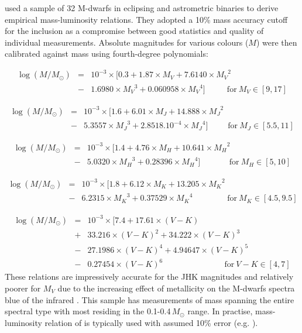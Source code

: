\citet{2000A&A...364..217D} used a sample of 32 M-dwarfs in eclipsing and astrometric binaries to derive empirical mass-luminosity relations. They adopted a 10\% mass accuracy cutoff for the inclusion as a compromise between good statistics and quality of individual measurements. Absolute magnitudes for various colours ($M$) were then calibrated against mass using fourth-degree polynomials:
%

\begin{eqnarray}
\log(M/{M_\odot}) &=& 10^{-3}{\times}[0.3+1.87{\times}{M_V} +7.6140{\times}{M_V}^2 \nonumber \\
&-&1.6980{\times}{M_V}^3 + 0.060958{\times}{M_V}^4] {\ \ \ \ \  \ \ \  \ \ \ \ }{\mathrm{for}} {\ }{M_V}  \in [9,17]
\end{eqnarray}

\begin{eqnarray}
\log(M/{M_\odot}) &=&10^{-3}{\times}[1.6+6.01{\times}{M_J}
+14.888{\times}{M_J}^2  \nonumber \\
&-&5.3557{\times}{M_J}^3 +2.8518.10^{-4}{\times}{M_J}^4] {\ \ \  \ \ \ \ \ \  \ \ }{\mathrm{for}} {\ }{M_J} \in [5.5,11] 
\end{eqnarray}

\begin{eqnarray}
\log(M/{M_\odot}) &=&10^{-3}{\times}[1.4+4.76{\times}{M_H}
+10.641{\times}{M_H}^2 \nonumber \\
 &-&5.0320{\times}{M_H}^3 +0.28396{\times}{M_H}^4] {\ \ \ \ \ \ \ \ \ \ \ \ \ \ \ \ }{\mathrm{for}} {\ }{M_H} \in [5,10] 
\end{eqnarray}

\begin{eqnarray}
\log(M/{M_\odot}) &=&10^{-3}{\times}[1.8+6.12{\times}{ M_K} +13.205{\times}{ M_K}^2 \nonumber \\
 &-&6.2315{\times}{ M_K}^3+0.37529{\times}{ M_K}^4
{\ \ \ \ \ \ \ \ \ \ \ \ \ \ \ \ \ \ \ }{\mathrm{for}} {\ }{ M_K} \in [4.5,9.5] 
\end{eqnarray}

\begin{eqnarray}
\log(M/{M_\odot})  &=&10^{-3}{\times}[7.4+17.61{\times}{ (V-K)} \nonumber  \\
&+&33.216{\times}{ (V-K)}^2 +34.222{\times}{ (V-K)}^3 \nonumber  \\
&-&27.1986{\times}{ (V-K)}^4 +4.94647{\times}{ (V-K)}^5  \nonumber \\
&-&0.27454{\times}{ (V-K)}^6 {\ \ \ \ \ \ \ \ \ \ \ \ \ \ \ \ \ \ \ \ \ \ \ \ \ \ \ \ \ \ \ \ \ \ }{\mathrm{for}} {\ }{ V-K} \in [4,7] 
\end{eqnarray}
%
These relations are impressively accurate for the JHK magnitudes and relatively poorer for $M_V$ due to the increasing effect of metallicity on the M-dwarfs spectra blue of the infrared \citep{2003IAUS..211..413S}. This sample has measurements of mass spanning the entire spectral type with most residing in the 0.1-0.4\,$M_\odot$ range. In practise, mass-luminosity relation of \citet{2000A&A...364..217D} is typically used with assumed 10\% error (e.g. \citealt{2015ApJ...804...64M}). 


